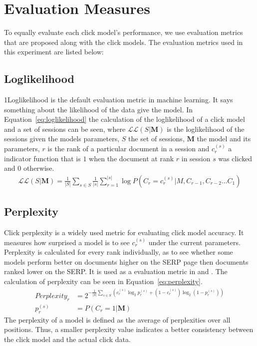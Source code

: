 \section{Evaluation Measures}
\label{sec:evaluation}
To equally evaluate each click model's performance, we use evaluation metrics that are proposed along with the click models. The evaluation metrics used in this experiment are listed below:

\subsection{Loglikelihood}
1Loglikelihood is the default evaluation metric in machine learning. It says something about the likelihood of the data give the model. In Equation~\ref{eq:loglikelihood} the calculation of the loglikelihood of a click model and a set of sessions can be seen, where $\mathcal{L}\mathcal{L}(S|\mathbf{M})$ is the loglikelihood of the sessions given the models parameters, $S$ the set of sessions, $\mathbf{M}$ the model and its parameters, $r$ is the rank of a particular document in a session and $c_r^{(s)}$ a indicator function that is $1$ when the document at rank $r$ in session $s$ was clicked and $0$ otherwise.
\begin{align}
	\mathcal{L}\mathcal{L}(S|\mathbf{M}) = \frac{1}{|S|}\sum_{s \in S} \frac{1}{|s|} \sum_{r = 1}^{|s|} \log P(C_r=c_r^{(s)}|M, C_{r-1}, C_{r-2}\dots C_1)
	\label{eq:loglikelihood}
\end{align}


\subsection{Perplexity}
Click perplexity is a widely used metric for evaluating click model accuracy. It measures how surprised a model is to see $c_r^{(s)}$ under the current parameters. Perplexity is calculated for every rank individually, as to see whether some models perform better on documents higher on the SERP page then documents ranked lower on the SERP. It is used as a evaluation metric in \cite{Zhang2011} and \cite{Dupret2008}. The calculation of perplexity can be seen in Equation~\ref{eq:perplexity}.
\begin{align}
	Perplexity_r &= 2^{-\frac{1}{|S|} \sum_{s \in S}(c_r^{(s)} \log_2 p_r^{(s)} + (1-c_r^{(s)} ) \log_2 (1-p_r^{(s)}))} \label{eq:perplexity} \\
	p_r^{(s)} &= P(C_r = 1 | \mathbf{M}) \nonumber
\end{align}
The perplexity of a model is defined as the average of perplexities over all positions. Thus, a smaller perplexity value indicates a better consistency between the click model and the actual click data.

